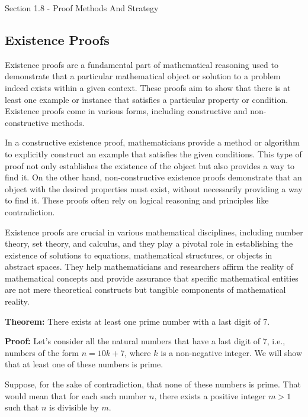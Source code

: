 \begin{notes}{Section 1.8 - Proof Methods And Strategy}
    \subsection*{Existence Proofs}

    Existence proofs are a fundamental part of mathematical reasoning used to demonstrate that a particular mathematical object or solution to a problem indeed exists within a given context. These proofs aim to show 
    that there is at least one example or instance that satisfies a particular property or condition. Existence proofs come in various forms, including constructive and non-constructive methods.

    In a constructive existence proof, mathematicians provide a method or algorithm to explicitly construct an example that satisfies the given conditions. This type of proof not only establishes the existence of the 
    object but also provides a way to find it. On the other hand, non-constructive existence proofs demonstrate that an object with the desired properties must exist, without necessarily providing a way to find it. These 
    proofs often rely on logical reasoning and principles like contradiction.

    Existence proofs are crucial in various mathematical disciplines, including number theory, set theory, and calculus, and they play a pivotal role in establishing the existence of solutions to equations, mathematical 
    structures, or objects in abstract spaces. They help mathematicians and researchers affirm the reality of mathematical concepts and provide assurance that specific mathematical entities are not mere theoretical constructs 
    but tangible components of mathematical reality.

    \begin{highlight}
        \textbf{Theorem:} There exists at least one prime number with a last digit of 7. \vspace*{1em}
    
    
        \textbf{Proof:} Let's consider all the natural numbers that have a last digit of 7, i.e., numbers of the form \(n = 10k + 7\), where \(k\) is a non-negative integer. We will show that at least one of these 
        numbers is prime.
    
        Suppose, for the sake of contradiction, that none of these numbers is prime. That would mean that for each such number \(n\), there exists a positive integer \(m > 1\) such that \(n\) is divisible by \(m\). 
    

\end{highlight}
\end{notes}
